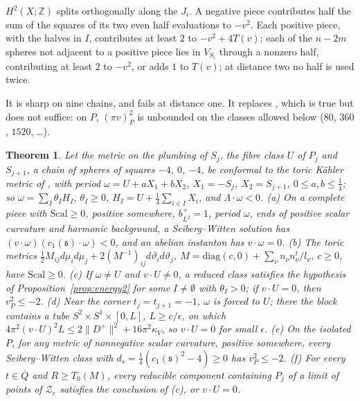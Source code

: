 \documentclass[10pt]{amsart}
\makeatletter
\numberwithin{equation}{section}
\theoremstyle{compact}
\newtheorem{theorem}{Theorem}[section]
\renewenvironment{proof}[1][\proofname]{\par\pushQED{\qed}\normalfont
  \topsep4\p@\relax\trivlist\item[\hskip\labelsep\itshape#1\@addpunct{.}]%
  \ignorespaces}{\popQED\endtrivlist\@endpefalse}
\newcommand{\Z}{\mathbb Z}
\newcommand{\fs}{\mathfrak s}
\newcommand{\cZ}{\mathcal Z}
\makeatother
\begin{document}
\begin{proof}
$H^2(X;\Z)$ splits orthogonally along the $J_i$. A negative piece contributes
half the sum of the squares of its two even half evaluations to $-v^2$. Each
positive piece, with the halves in $I$, contributes at least $2$ to
$-v^2+4T(v)$; each of the $n-2m$ spheres not adjacent to a positive piece lies
in $V_{S_i}$ through a nonzero half, contributing at least $2$ to $-v^2$, or
adds $1$ to $T(v)$; at distance two no half is used twice.
\end{proof}

It is sharp on nine chains, and fails at distance one. It replaces
\cite[Prop.~4.2]{FS}, which is true but does not suffice: on $P$, $(\pi v)_P^2$
is unbounded on the classes allowed below ($80$, $360$, $1520$, \dots).

\begin{theorem}\label{thm:P}
Let the metric on the plumbing of $S_j$, the fibre class $U$ of $P_j$ and
$S_{j+1}$, a chain of spheres of squares $-4$, $0$, $-4$, be conformal to the
toric K\"ahler metric of \cite[\S6]{MS}, with period $\omega=U+aX_1+bX_2$,
$X_1=-S_j$, $X_2=S_{j+1}$, $0\le a,b\le\frac14$; so $\omega=\sum_I\theta_IH_I$,
$\theta_I\ge0$, $H_I=U+\frac14\sum_{i\in I}X_i$, and $\Lambda\cdot\omega<0$.
\textup{(a)} On a complete piece with $\mathrm{Scal}\ge0$, positive somewhere,
$b^+_{L^2}=1$, period $\omega$, ends of positive scalar curvature and harmonic
background, a Seiberg--Witten solution has $(v\cdot\omega)(c_1(\fs)\cdot
\omega)<0$, and an abelian instanton has $v\cdot\omega=0$.
\textup{(b)} The toric metrics $\frac12M_{ij}d\mu_id\mu_j+2(M^{-1})_{ij}d
\vartheta_id\vartheta_j$, $M=\mathrm{diag}(c,0)+\sum_\nu n_\nu n_\nu^t/l_\nu$,
$c\ge0$, have $\mathrm{Scal}\ge0$.
\textup{(c)} If $\omega\ne U$ and $v\cdot U\ne0$, a reduced class satisfies the
hypothesis of Proposition~\ref{prop:energy2} for some $I\ne\emptyset$ with
$\theta_I>0$; if $v\cdot U=0$, then $v_P^2\le-2$.
\textup{(d)} Near the corner $t_j=t_{j+1}=-1$, $\omega$ is forced to $U$; there
the block contains a tube $S^2\times S^1\times[0,L]$, $L\ge c/\epsilon$, on which
$4\pi^2(v\cdot U)^2L\le2\|D^+\|^2+16\pi^2\kappa_V$, so $v\cdot U=0$ for small
$\epsilon$.
\textup{(e)} On the isolated $P$, for any metric of nonnegative scalar
curvature, positive somewhere, every Seiberg--Witten class with
$d_s=\frac14(c_1(\fs)^2-4)\ge0$ has $v_P^2\le-2$.
\textup{(f)} For every $t\in\bar Q$ and $R\ge T_0(M)$, every reducible component
containing $P_j$ of a limit of points of $\cZ_e$ satisfies the conclusion of
\textup{(c)}, or $v\cdot U=0$.
\end{theorem}
\end{document}
